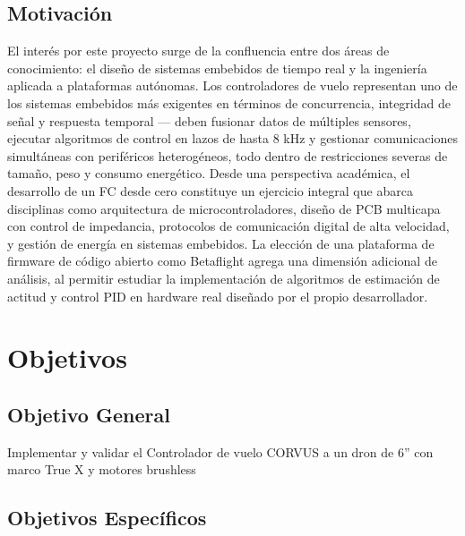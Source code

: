 \documentclass[12pt, letterpaper]{report}
\begin{document}
\subsection{Motivación}
El interés por este proyecto surge de la confluencia entre dos áreas de conocimiento: el diseño de sistemas embebidos de tiempo real y la ingeniería aplicada a plataformas autónomas. Los controladores de vuelo representan uno de los sistemas embebidos más exigentes en términos de concurrencia, integridad de señal y respuesta temporal — deben fusionar datos de múltiples sensores, ejecutar algoritmos de control en lazos de hasta 8 kHz y gestionar comunicaciones simultáneas con periféricos heterogéneos, todo dentro de restricciones severas de tamaño, peso y consumo energético.
Desde una perspectiva académica, el desarrollo de un FC desde cero constituye un ejercicio integral que abarca disciplinas como arquitectura de microcontroladores, diseño de PCB multicapa con control de impedancia, protocolos de comunicación digital de alta velocidad, y gestión de energía en sistemas embebidos. La elección de una plataforma de firmware de código abierto como Betaflight agrega una dimensión adicional de análisis, al permitir estudiar la implementación de algoritmos de estimación de actitud y control PID en hardware real diseñado por el propio desarrollador.
\pagebreak

\section{Objetivos}
\subsection{Objetivo General}
Implementar  y validar el Controlador de vuelo CORVUS a un dron de 6” con marco True X y motores brushless

\subsection{Objetivos Específicos}
\end{document}
